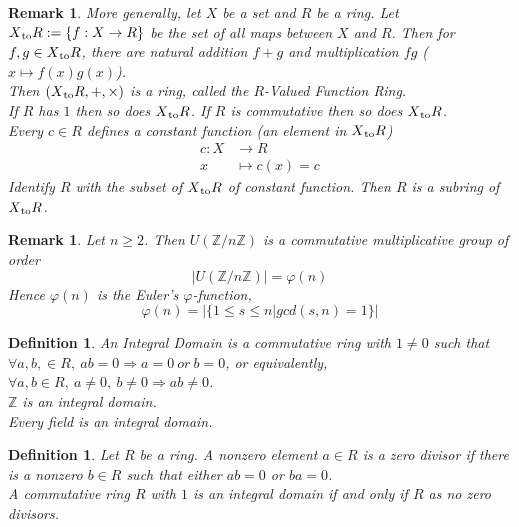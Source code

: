 \documentclass[a4paper,8pt]{article}
\newcommand{\hlt}[1]{\textit{{\color{blue}#1}}}
\theoremstyle{theorem}
\newtheorem{definition}[theorem]{Definition}
\newtheorem{remark}[theorem]{Remark}
\begin{document}
\begin{remark}
More generally, let $X$ be a set and $R$ be a ring. Let $X \textsubscript{to} R := \{f: X \rightarrow R\}$ be the set of all maps between $X$ and $R$. Then for $f, g \in X \textsubscript{to} R $, there are natural addition $f+g$ and multiplication $fg$ ($x\mapsto f(x)g(x)$).\\
Then $(X \textsubscript{to} R, +, \times)$ is a ring, called the \hlt{$R$-Valued Function Ring}.\\
If $R$ has $1$ then so does $X \textsubscript{to} R$. If $R$ is commutative then so does $X \textsubscript{to} R$.\\
Every $c\in R$ defines a constant function (an element in $X \textsubscript{to} R$)
\begin{align}
c:X &\rightarrow R \nonumber \\
x &\mapsto c(x)=c \nonumber
\end{align}
Identify $R$ with the subset of $X \textsubscript{to} R$ of constant function. Then $R$ is a subring of $X \textsubscript{to} R$.\\
\end{remark}


\begin{remark}
Let $n \geq 2$. Then $U(\mathbb{Z}/n\mathbb{Z})$ is a commutative multiplicative group of order 
\begin{equation}
\left| U(\mathbb{Z}/n\mathbb{Z}) \right| = \varphi (n) \nonumber
\end{equation}
Hence $\varphi (n)$ is the \hlt{Euler's $\varphi$-function}, 
\begin{equation}
\varphi (n)=\left|\{1 \leq s \leq n | gcd(s, n) = 1\}\right| \nonumber
\end{equation}
\end{remark}


\begin{definition}
An \hlt{Integral Domain} is a commutative ring with $1\neq 0$ such that $\forall a, b, \in R, \ ab = 0 \Rightarrow a=0 \ or \ b=0$,
or equivalently, $\forall a, b \in R, \ a \neq 0, \ b \neq 0 \Rightarrow ab \neq 0$.\\
$\mathbb{Z}$ is an integral domain.\\
Every field is an integral domain.\\
\end{definition}


\begin{definition}
Let $R$ be a ring. A nonzero element $a \in R$ is a 	\hlt{zero divisor} if there is a nonzero $b\in R$ such that either $ab=0$ or $ba=0$.\\
A commutative ring $R$ with $1$ is an integral domain if and only if $R$ as no zero divisors.\\
\end{definition}
\end{document}
